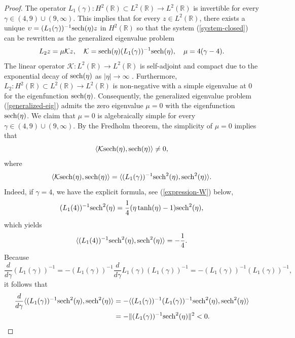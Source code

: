 \documentclass[12pt,reqno]{amsart}
\numberwithin{equation}{section}
\begin{document}
\begin{proof}
The operator $L_1(\gamma) : H^2(\mathbb{R}) \subset L^2(\mathbb{R}) \to L^2(\mathbb{R})$ is invertible for every $\gamma \in (4,9) \cup (9,\infty)$. 
This implies that for every $z \in L^2(\mathbb{R})$, there exists a unique $\upsilon = (L_1(\gamma))^{-1} {\rm sech}(\eta) z$ in $H^2(\mathbb{R})$ 
so that the system (\ref{system-closed}) can be rewritten as the generalized eigenvalue problem 
\begin{equation}
\label{generalized-eig}
    L_2 z = \mu \mathcal{K} z, \quad \mathcal{K} = {\rm sech}(\eta) (L_1(\gamma))^{-1} {\rm sech}(\eta), \quad \mu = 4(\gamma - 4).
\end{equation}
The linear operator $\mathcal{K} : L^2(\mathbb{R}) \to L^2(\mathbb{R})$ is self-adjoint and compact due to the exponential decay 
of ${\rm sech}(\eta)$ as $|\eta| \to \infty$ \cite[Section 5.6]{Gustafson}. Furthermore, $L_2 : H^2(\mathbb{R}) \subset L^2(\mathbb{R}) \to L^2(\mathbb{R})$ 
is non-negative with a simple eigenvalue at $0$ for the eigenfunction ${\rm sech}(\eta)$. Consequently, the generalized eigenvalue 
problem (\ref{generalized-eig}) admits the zero eigenvalue $\mu = 0$ with the eigenfunction ${\rm sech}(\eta)$. We claim that $\mu = 0$ is algebraically simple for every $\gamma \in (4,9) \cup (9,\infty)$. By the Fredholm theorem, the simplicity of $\mu = 0$ implies 
that 
\begin{equation}
    \label{Fredholm-cond}
\langle \mathcal{K} {\rm sech}(\eta), {\rm sech}(\eta) \rangle \neq 0, 
\end{equation}
where
\begin{equation*}
\langle \mathcal{K} {\rm sech}(\eta), {\rm sech}(\eta) \rangle = \langle (L_1(\gamma))^{-1} {\rm sech}^2(\eta), {\rm sech}^2(\eta) \rangle.
\end{equation*}
Indeed, if $\gamma = 4$, we have the explicit formula, see (\ref{expression-W}) below,
$$
(L_1(4))^{-1} {\rm sech}^2(\eta) = \frac{1}{4} ( \eta \tanh(\eta) - 1) {\rm sech}^2(\eta),
$$
which yields 
$$
\langle (L_1(4))^{-1} {\rm sech}^2(\eta), {\rm sech}^2(\eta) \rangle = -\frac{1}{4}. 
$$
Because 
$$
\frac{d}{d\gamma} (L_1(\gamma))^{-1} = -(L_1(\gamma))^{-1} \frac{d}{d\gamma} L_1(\gamma) (L_1(\gamma))^{-1} = -(L_1(\gamma))^{-1} (L_1(\gamma))^{-1},
$$
it follows that 
\begin{align*}
\frac{d}{d \gamma} \langle (L_1(\gamma))^{-1} {\rm sech}^2(\eta), {\rm sech}^2(\eta) \rangle &= 
-\langle (L_1(\gamma))^{-1} (L_1(\gamma))^{-1} {\rm sech}^2(\eta), {\rm sech}^2(\eta) \rangle \\
&= -\| (L_1(\gamma))^{-1} {\rm sech}^2(\eta) \|^2 < 0.

\end{align*}
\end{proof}
\end{document}
